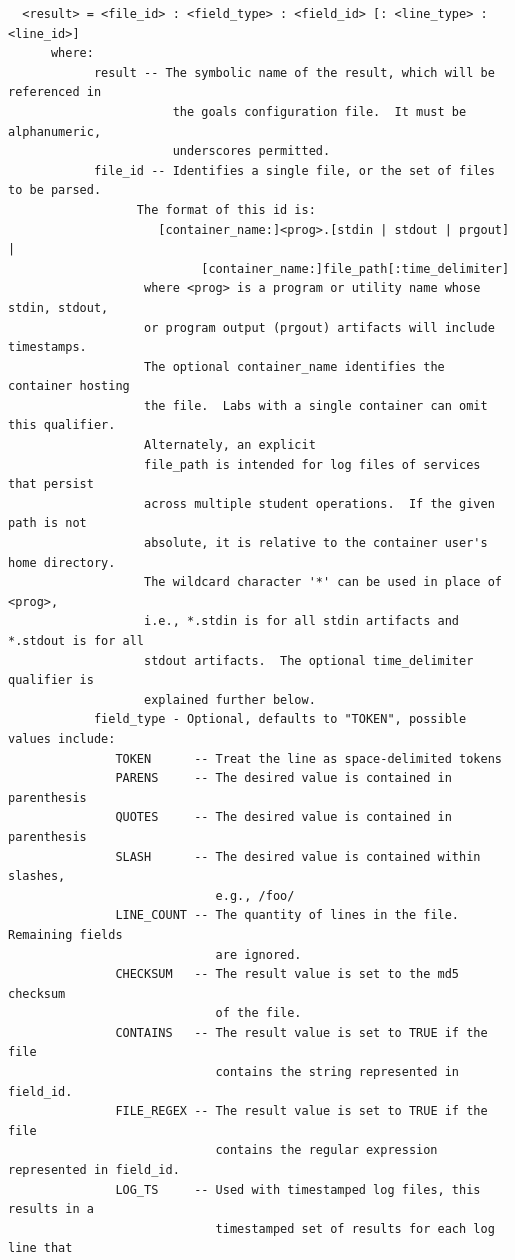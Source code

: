\documentclass[12pt]{article}
\begin{document}
\begin{verbatim}
  <result> = <file_id> : <field_type> : <field_id> [: <line_type> : <line_id>]
      where:
            result -- The symbolic name of the result, which will be referenced in 
                       the goals configuration file.  It must be alphanumeric, 
                       underscores permitted.
            file_id -- Identifies a single file, or the set of files to be parsed.  
                  The format of this id is:
                     [container_name:]<prog>.[stdin | stdout | prgout] | 
                           [container_name:]file_path[:time_delimiter]
                   where <prog> is a program or utility name whose stdin, stdout,
                   or program output (prgout) artifacts will include timestamps.  
                   The optional container_name identifies the container hosting 
                   the file.  Labs with a single container can omit this qualifier.  
                   Alternately, an explicit 
                   file_path is intended for log files of services that persist 
                   across multiple student operations.  If the given path is not 
                   absolute, it is relative to the container user's home directory. 
                   The wildcard character '*' can be used in place of <prog>,
                   i.e., *.stdin is for all stdin artifacts and *.stdout is for all 
                   stdout artifacts.  The optional time_delimiter qualifier is 
                   explained further below.
            field_type - Optional, defaults to "TOKEN", possible values include:
               TOKEN      -- Treat the line as space-delimited tokens
               PARENS     -- The desired value is contained in parenthesis
               QUOTES     -- The desired value is contained in parenthesis
               SLASH      -- The desired value is contained within slashes, 
                             e.g., /foo/
               LINE_COUNT -- The quantity of lines in the file. Remaining fields 
                             are ignored.
               CHECKSUM   -- The result value is set to the md5 checksum 
                             of the file.
               CONTAINS   -- The result value is set to TRUE if the file 
                             contains the string represented in field_id.
               FILE_REGEX -- The result value is set to TRUE if the file 
                             contains the regular expression represented in field_id.
               LOG_TS     -- Used with timestamped log files, this results in a 
                             timestamped set of results for each log line that

\end{verbatim}
\end{document}
